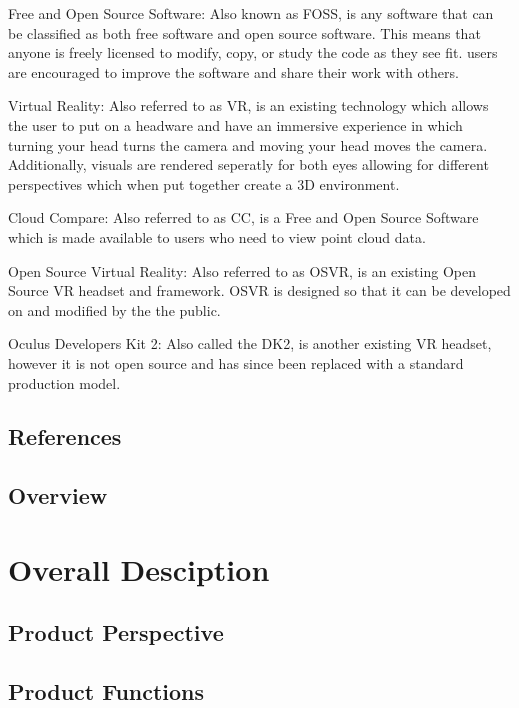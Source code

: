 \documentclass[titlepage]{article}
\begin{document}
Free and Open Source Software: Also known as FOSS, is any software that can be classified as both free software and open source software. This means that anyone is freely licensed to modify, copy, or study the code as they see fit. users are encouraged to improve the software and share their work with others.

Virtual Reality: Also referred to as VR, is an existing technology which allows the user to put on a headware and have an immersive experience in which turning your head turns the camera and moving your head moves the camera.
Additionally, visuals are rendered seperatly for both eyes allowing for different perspectives which when put together create a 3D environment.

Cloud Compare: Also referred to as CC, is a Free and Open Source Software which is made available to users who need to view point cloud data.

Open Source Virtual Reality: Also referred to as OSVR, is an existing Open Source VR headset and framework. OSVR is designed so that it can be developed on and modified by the the public.

Oculus Developers Kit 2: Also called the DK2, is another existing VR headset, however it is not open source and has since been replaced with a standard production model.

\subsection{References}



\subsection{Overview}



\section{Overall Desciption}
\subsection{Product Perspective}



\subsection{Product Functions}
\end{document}
